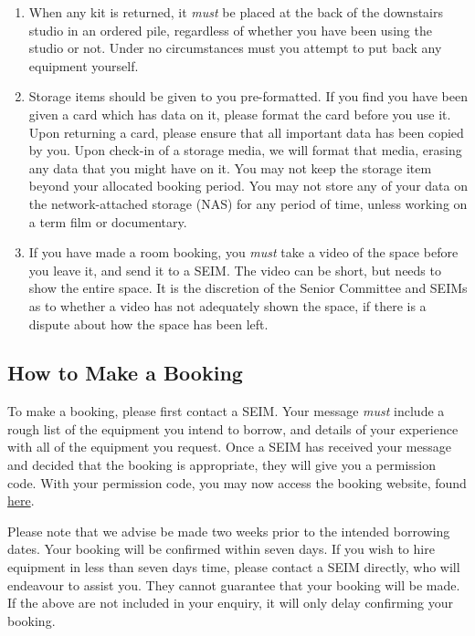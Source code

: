 \documentclass[]{article}
\begin{document}
\begin{enumerate}
    \item When any kit is returned, it \textit{must} be placed at the back of the downstairs studio in an ordered pile, regardless of whether you have been using the studio or not. Under no circumstances must you attempt to put back any equipment yourself.
    \item Storage items should be given to you pre-formatted. If you find you have been given a card which has data on it, please format the card before you use it. Upon returning a card, please ensure that all important data has been copied by you. Upon check-in of a storage media, we will format that media, erasing any data that you might have on it. You may not keep the storage item beyond your allocated booking period. You may not store any of your data on the network-attached storage (NAS) for any period of time, unless working on a term film or documentary.
    \item If you have made a room booking, you \textit{must} take a video of the space before you leave it, and send it to a SEIM. The video can be short, but needs to show the entire space. It is the discretion of the Senior Committee and SEIMs as to whether a video has not adequately shown the space, if there is a dispute about how the space has been left.
\end{enumerate}
\subsection{How to Make a Booking}
To make a booking, please first contact a SEIM. Your message \textit{must} include a rough list of the equipment you intend to borrow, and details of your experience with all of the equipment you request. Once a SEIM has received your message and decided that the booking is appropriate, they will give you a permission code. With your permission code, you may now access the booking website, found \href{https://ucl-film-tv-society.booqable.shop/}{here}. 

Please note that we advise be made two weeks prior to the intended borrowing dates. Your booking will be confirmed within seven days. If you wish to hire equipment in less than seven days time, please contact a SEIM directly, who will endeavour to assist you. They cannot guarantee that your booking will be made. If the above are not included in your enquiry, it will only delay confirming your booking.
\end{document}
